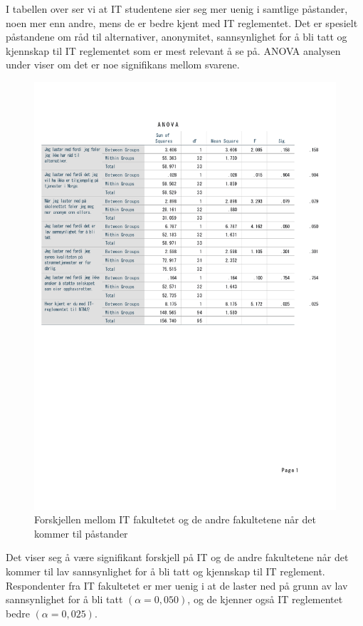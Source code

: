 I tabellen over ser vi at IT studentene sier seg mer uenig i samtlige påstander, noen mer enn andre, mens de er bedre kjent med IT reglementet. Det er spesielt påstandene om råd til alternativer, anonymitet, sannsynlighet for å bli tatt og kjennskap til IT reglementet som er mest relevant å se på. ANOVA analysen under viser om det er noe signifikans mellom svarene. 
\begin{figure}[H]
    \centering
    \includegraphics[scale=0.7]{case_1/bilder/fakultet_pastander_anova.pdf}
    \caption{Forskjellen mellom IT fakultetet og de andre fakultetene når det kommer til påstander}
    \label{fig:fakultet_pastander_anova}
\end{figure}

Det viser seg å være signifikant forskjell på IT og de andre fakultetene når det kommer til lav sannsynlighet for å bli tatt og kjennskap til IT reglement. Respondenter fra IT fakultetet er mer uenig i at de laster ned på grunn av lav sannsynlighet for å bli tatt \((\alpha = 0,050)\), og de kjenner også IT reglementet bedre \((\alpha = 0,025)\). 

